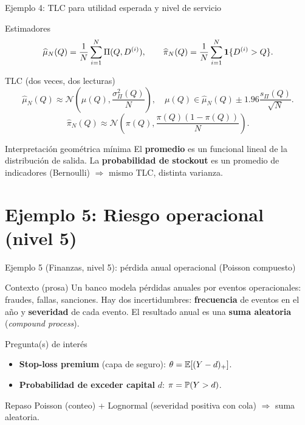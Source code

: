 \documentclass[aspectratio=1610, 9pt]{beamer}
\begin{document}
\begin{frame}{Ejemplo 4: TLC para utilidad esperada y nivel de servicio}
\small
\begin{block}{Estimadores}
\[
\widehat{\mu}_N(Q)=\frac{1}{N}\sum_{i=1}^N \Pi(Q,D^{(i)}),
\qquad
\widehat{\pi}_N(Q)=\frac{1}{N}\sum_{i=1}^N \mathbf{1}\{D^{(i)}>Q\}.
\]
\end{block}

\begin{block}{TLC (dos veces, dos lecturas)}
\[
\widehat{\mu}_N(Q)\approx \mathcal{N}\!\left(\mu(Q),\frac{\sigma_\Pi^2(Q)}{N}\right),
\quad
\mu(Q)\in \widehat{\mu}_N(Q)\pm 1.96\frac{s_\Pi(Q)}{\sqrt{N}}.
\]
\[
\widehat{\pi}_N(Q)\approx \mathcal{N}\!\left(\pi(Q),\frac{\pi(Q)(1-\pi(Q))}{N}\right).
\]
\end{block}

\begin{alertblock}{Interpretación geométrica mínima}
El \textbf{promedio} es un funcional lineal de la distribución de salida.
La \textbf{probabilidad de stockout} es un promedio de indicadores (Bernoulli) $\Rightarrow$ mismo TLC, distinta varianza.
\end{alertblock}
\end{frame}

\section*{Ejemplo 5: Riesgo operacional (nivel 5)}

\begin{frame}{Ejemplo 5 (Finanzas, nivel 5): pérdida anual operacional (Poisson compuesto)}
\small
\begin{block}{Contexto (prosa)}
Un banco modela pérdidas anuales por eventos operacionales: fraudes, fallas, sanciones.
Hay dos incertidumbres: \textbf{frecuencia} de eventos en el año y \textbf{severidad} de cada evento.
El resultado anual es una \textbf{suma aleatoria} (\emph{compound process}).
\end{block}

\begin{block}{Pregunta(s) de interés}
\begin{itemize}
\item \textbf{Stop-loss premium} (capa de seguro): $\theta=\mathbb{E}[(Y-d)_+]$.
\item \textbf{Probabilidad de exceder capital} $d$: $\pi=\mathbb{P}(Y>d)$.
\end{itemize}
\end{block}

\begin{alertblock}{Repaso}
Poisson (conteo) + Lognormal (severidad positiva con cola) $\Rightarrow$ suma aleatoria.
\end{alertblock}
\end{frame}
\end{document}
